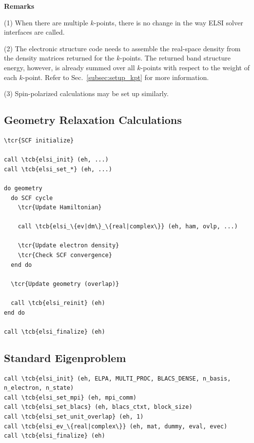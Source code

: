 \documentclass{report}
\newcommand{\tcb}[1]{\textcolor{blue}{#1}}
\newcommand{\tcr}[1]{\textcolor{red}{#1}}
\begin{document}
\textbf{Remarks}

(1) When there are multiple $k$-points, there is no change in the way ELSI solver interfaces are called.

(2) The electronic structure code needs to assemble the real-space density from the density matrices returned for the $k$-points. The returned band structure energy, however, is already summed over all $k$-points with respect to the weight of each $k$-point. Refer to Sec.~\ref{subsec:setup_kpt} for more information.

(3) Spin-polarized calculations may be set up similarly.

\subsection*{Geometry Relaxation Calculations}
\begin{tcolorbox}
\begin{Verbatim}[commandchars=\\\{\}]
\tcr{SCF initialize}

call \tcb{elsi_init} (eh, ...)
call \tcb{elsi_set_*} (eh, ...)

do geometry
  do SCF cycle
    \tcr{Update Hamiltonian}

    call \tcb{elsi_\{ev|dm\}_\{real|complex\}} (eh, ham, ovlp, ...)

    \tcr{Update electron density}
    \tcr{Check SCF convergence}
  end do

  \tcr{Update geometry (overlap)}

  call \tcb{elsi_reinit} (eh)
end do

call \tcb{elsi_finalize} (eh)
\end{Verbatim}
\end{tcolorbox}

\subsection*{Standard Eigenproblem}
\begin{tcolorbox}
\begin{Verbatim}[commandchars=\\\{\}]
call \tcb{elsi_init} (eh, ELPA, MULTI_PROC, BLACS_DENSE, n_basis, n_electron, n_state)
call \tcb{elsi_set_mpi} (eh, mpi_comm)
call \tcb{elsi_set_blacs} (eh, blacs_ctxt, block_size)
call \tcb{elsi_set_unit_overlap} (eh, 1)
call \tcb{elsi_ev_\{real|complex\}} (eh, mat, dummy, eval, evec)
call \tcb{elsi_finalize} (eh)
\end{Verbatim}
\end{tcolorbox}
\end{document}
